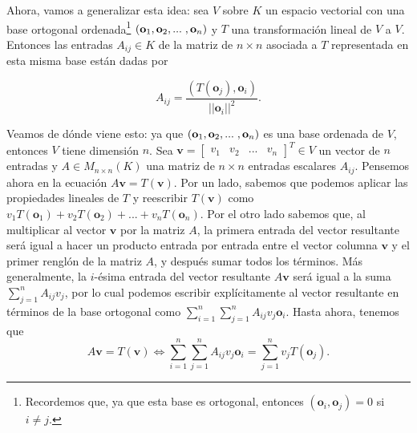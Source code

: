 \documentclass[12pt]{article}
\begin{document}
Ahora, vamos a generalizar esta idea: sea $V$ sobre $K$ un espacio vectorial con una base ortogonal ordenada\footnote{Recordemos que, ya que esta base es ortogonal, entonces $(\mathbf{o}_i,\mathbf{o}_j)=0$ si $i\neq j$.} $(\mathbf{o}_1,\mathbf{o}_2,...\hspace{1mm},\mathbf{o}_n)$ y $T$ una transformación lineal de $V$ a $V$. Entonces las entradas $A_{ij}\in K$ de la matriz de $n\times n$ asociada a $T$ representada en esta misma base están dadas por

\[A_{ij}=\frac{(T(\mathbf{o}_j),\mathbf{o}_i)}{||\mathbf{o}_i||^2}.\]

Veamos de dónde viene esto: ya que $(\mathbf{o}_1,\mathbf{o}_2,...\hspace{1mm},\mathbf{o}_n)$ es una base ordenada de $V$, entonces $V$ tiene dimensión $n$. Sea $\mathbf{v}=\begin{bmatrix} v_1&v_2&...&v_n \end{bmatrix}^T \in V$ un vector de $n$ entradas y $A\in M_{n\times n}(K)$ una matriz de $n\times n$ entradas escalares $A_{ij}$. Pensemos ahora en la ecuación $A\mathbf{v}=T(\mathbf{v}).$ Por un lado, sabemos que podemos aplicar las propiedades lineales de $T$ y reescribir $T(\mathbf{v})$ como $v_1T(\mathbf{o}_1)+v_2T(\mathbf{o}_2)+...+v_nT(\mathbf{o}_n).$ Por el otro lado sabemos que, al multiplicar al vector $\mathbf{v}$ por la matriz $A$, la primera entrada del vector resultante será igual a hacer un producto entrada por entrada entre el vector columna $\mathbf{v}$ y el primer renglón de la matriz $A$, y después sumar todos los términos. Más generalmente, la $i$-ésima entrada del vector resultante $A\mathbf{v}$ será igual a la suma $\sum_{j=1}^n A_{ij} v_j$, por lo cual podemos escribir explícitamente al vector resultante en términos de la base ortogonal como $\sum_{i=1}^n \sum_{j=1}^n A_{ij} v_j \mathbf{o}_i$. Hasta ahora, tenemos que \[
    A\mathbf{v}=T(\mathbf{v}) \iff \sum_{i=1}^n \sum_{j=1}^n A_{ij} v_j \mathbf{o}_i = \sum_{j=1}^n v_j T(\mathbf{o}_j) 
.\] 
\end{document}
